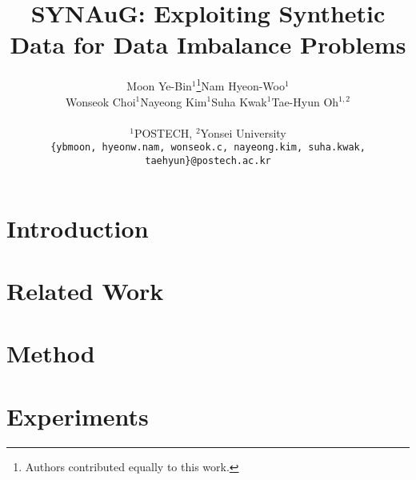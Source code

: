 \documentclass[10pt,twocolumn,letterpaper]{article}
\begin{document}
\title{SYNAuG: Exploiting Synthetic Data for Data Imbalance Problems}

\author{
\begin{tabular}{c c c c}
     & Moon Ye-Bin${}^{1}$\thanks{Authors contributed equally to this work.} & Nam Hyeon-Woo${}^{1}$\footnotemark[1] &  \\
    Wonseok Choi${}^{1}$ & Nayeong Kim${}^{1}$ & Suha Kwak${}^{1}$ & Tae-Hyun Oh${}^{1,2}$ \vspace{2mm}\\
\end{tabular}\\
    ${}^{1}$POSTECH, \quad${}^{2}$Yonsei University\\
    \texttt{\footnotesize{\{ybmoon, hyeonw.nam, wonseok.c, nayeong.kim, suha.kwak, taehyun\}@postech.ac.kr}}
}
\maketitle

\begin{abstract}
    
\end{abstract}


\section{Introduction}\label{sec:intro}

\section{Related Work}\label{sec:rw}

\section{Method}\label{sec:synaug}

\section{Experiments}

\end{document}
